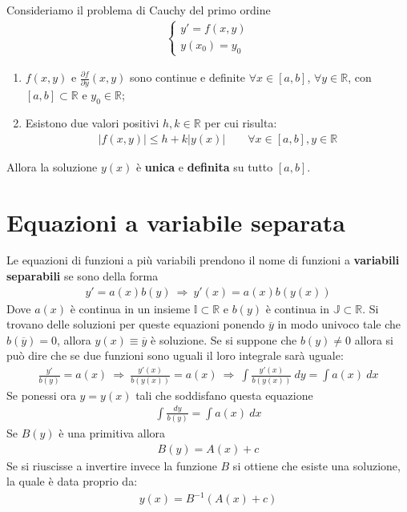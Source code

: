 \documentclass[a4paper, oneside]{book}
\begin{document}
\begin{theorem}
    Consideriamo il problema di Cauchy del primo ordine
    \begin{gather*}
        \left\{\begin{array}{l}
            y' = f(x, y) \\
            y(x_0) = y_0
        \end{array}\right.
    \end{gather*}
    \begin{enumerate}
        \item $f(x, y)$ e $\frac{\partial f}{\partial y}(x, y)$ sono continue e definite
        $\forall x \in [a, b]$, $\forall y \in \mathbb{R}$, con $[a,b] \subset \mathbb{R}$ e $y_0 \in \mathbb{R}$;
        \item Esistono due valori positivi $h, k \in \mathbb{R}$ per cui risulta:
        \begin{gather*}
            |f(x, y)| \leq h + k|y(x)| \qquad \forall x \in [a, b], y \in \mathbb{R}
        \end{gather*} 
    \end{enumerate}
    Allora la soluzione $y(x)$ è \textbf{unica} e \textbf{definita} su tutto $[a, b]$.
\end{theorem}


\section{Equazioni a variabile separata}
Le equazioni di funzioni a più variabili prendono il nome di funzioni a \textbf{variabili separabili}
se sono della forma 
\begin{align}
    y' = a(x) b(y) \ \Longrightarrow \ y'(x) = a(x)b(y(x))
\end{align}
Dove $a(x)$ è continua in un insieme $\mathbb{I} \subset \mathbb{R}$ e $b(y)$ è continua
in $\mathbb{J} \subset \mathbb{R}$. Si trovano delle soluzioni per queste equazioni ponendo 
$\overline{y}$ in modo univoco tale che $b(\overline{y}) = 0$, allora $y(x) \equiv \overline{y}$ è soluzione.
Se si suppone che $b(y) \neq 0$ allora si può dire che se due funzioni sono uguali il loro integrale sarà uguale:
\begin{gather*}
    \frac{y'}{b(y)} = a(x) \ \Longrightarrow \ \frac{y'(x)}{b(y(x))} = a(x) \ \Longrightarrow \ \int\frac{y'(x)}{b(y(x))} \ dy = \int a(x) \ dx
\end{gather*}
Se ponessi ora $y = y(x)$ tali che soddisfano questa equazione
\begin{gather*}
    \int \frac{dy}{b(y)} = \int a(x) \ dx
\end{gather*}
Se $B(y)$ è una primitiva allora
\begin{gather*}
    B(y) = A(x) + c
\end{gather*}
Se si riuscisse a invertire invece la funzione $B$ si ottiene che esiste una soluzione,
la quale è data proprio da:
\begin{gather*}
    y(x) = B^{-1} (A(x) + c)
\end{gather*}
\end{document}
